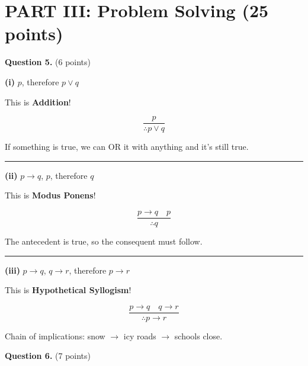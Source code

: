 \documentclass[11pt,a4paper]{article}
\begin{document}
\newpage

\section*{PART III: Problem Solving (25 points)}

\textbf{Question 5.} (6 points)

\begin{solnbox}
\textbf{(i)} $p$, therefore $p \lor q$

This is \textbf{Addition}!

$$\frac{p}{\therefore p \lor q}$$

If something is true, we can OR it with anything and it's still true.

\rule{\linewidth}{0.3pt}

\textbf{(ii)} $p \to q$, $p$, therefore $q$

This is \textbf{Modus Ponens}!

$$\frac{p \to q \quad p}{\therefore q}$$

The antecedent is true, so the consequent must follow.

\rule{\linewidth}{0.3pt}

\textbf{(iii)} $p \to q$, $q \to r$, therefore $p \to r$

This is \textbf{Hypothetical Syllogism}!

$$\frac{p \to q \quad q \to r}{\therefore p \to r}$$

Chain of implications: snow $\to$ icy roads $\to$ schools close.
\end{solnbox}

\vspace{15pt}

\textbf{Question 6.} (7 points)
\end{document}
